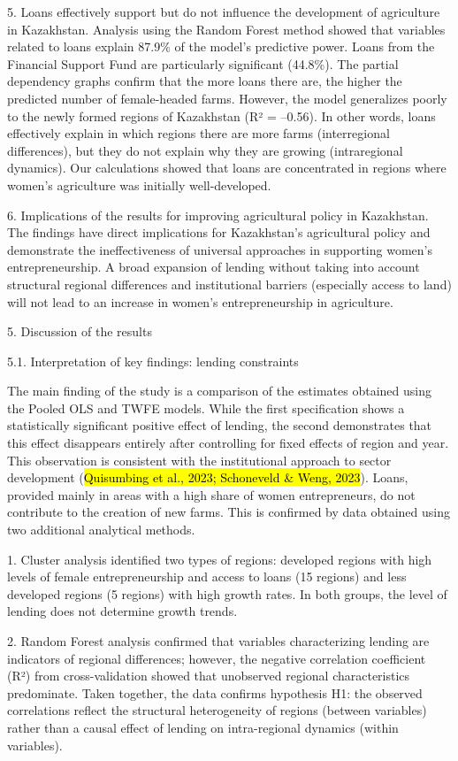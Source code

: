 \documentclass[
]{article}
\begin{document}
5. Loans effectively support but do not influence the development of
agriculture in Kazakhstan. Analysis using the Random Forest method
showed that variables related to loans explain 87.9\% of the model's
predictive power. Loans from the Financial Support Fund are particularly
significant (44.8\%). The partial dependency graphs confirm that the
more loans there are, the higher the predicted number of female-headed
farms. However, the model generalizes poorly to the newly formed regions
of Kazakhstan (R² = --0.56). In other words, loans effectively explain
in which regions there are more farms (interregional differences), but
they do not explain why they are growing (intraregional dynamics). Our
calculations showed that loans are concentrated in regions where women's
agriculture was initially well-developed.

6. Implications of the results for improving agricultural policy in
Kazakhstan. The findings have direct implications for Kazakhstan's
agricultural policy and demonstrate the ineffectiveness of universal
approaches in supporting women's entrepreneurship. A broad expansion of
lending without taking into account structural regional differences and
institutional barriers (especially access to land) will not lead to an
increase in women's entrepreneurship in agriculture.

5. Discussion of the results

5.1. Interpretation of key findings: lending constraints

The main finding of the study is a comparison of the estimates obtained
using the Pooled OLS and TWFE models. While the first specification
shows a statistically significant positive effect of lending, the second
demonstrates that this effect disappears entirely after controlling for
fixed effects of region and year. This observation is consistent with
the institutional approach to sector development (\hl{Quisumbing et al.,
2023; Schoneveld \& Weng, 2023}). Loans, provided mainly in areas with a
high share of women entrepreneurs, do not contribute to the creation of
new farms. This is confirmed by data obtained using two additional
analytical methods.

1. Cluster analysis identified two types of regions: developed regions
with high levels of female entrepreneurship and access to loans (15
regions) and less developed regions (5 regions) with high growth rates.
In both groups, the level of lending does not determine growth trends.

2. Random Forest analysis confirmed that variables characterizing
lending are indicators of regional differences; however, the negative
correlation coefficient (R²) from cross-validation showed that
unobserved regional characteristics predominate. Taken together, the
data confirms hypothesis H1: the observed correlations reflect the
structural heterogeneity of regions (between variables) rather than a
causal effect of lending on intra-regional dynamics (within variables).
\end{document}
